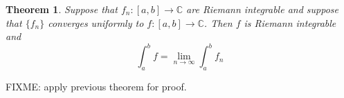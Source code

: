 \documentclass[12pt]{book}
\newcommand{\abs}[1]{\left\lvert {#1} \right\rvert}
\newcommand{\C}{{\mathbb{C}}}
\newcommand{\N}{{\mathbb{N}}}
\theoremstyle{plain}
\newtheorem{thm}{Theorem}[section]
\theoremstyle{remark}
\theoremstyle{definition}
\theoremstyle{exercise}
\theoremstyle{example}
\begin{document}

\begin{thm}
Suppose that $f_n \colon [a,b] \to \C$
are Riemann integrable and suppose that $\{ f_n \}$ converges
uniformly to $f \colon [a,b] \to \C$.  Then $f$ is Riemann integrable
and
\begin{equation*}
\int_a^b f = \lim_{n\to \infty} \int_a^b f_n
\end{equation*}
\end{thm}


FIXME: apply previous theorem for proof.

%
%
\end{document}
